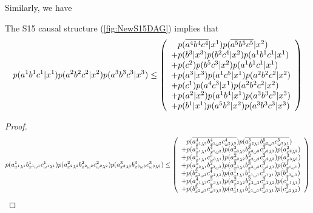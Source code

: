 \clearpage
Similarly, we have
\begin{prop}\label{prop:s15d3}
The S15 causal structure (\cref{fig:NewS15DAG}) implies that
\begin{align*}
p\lparen a^1 b^1 c^1|x^1\rparen p\lparen a^2 b^2 c^2|x^2\rparen p\lparen a^3 b^3 c^3|x^3\rparen
\leq
\left\lparen\begin{array}{l}
\hphantom{+}p\lparen\overline{a^4} \overline{b^4} \overline{c^4}|x^1\rparen p\lparen\overline{a^5} \overline{b^5} \overline{c^5}|x^2\rparen
\\+p\lparen b^3|x^3\rparen p\lparen b^2 c^4|x^2\rparen p\lparen a^1 b^1 c^1|x^1\rparen
\\+p\lparen c^2\rparen p\lparen b^5 c^3|x^2\rparen p\lparen a^1 b^1 c^1|x^1\rparen
\\+p\lparen a^3|x^3\rparen p\lparen a^1 c^5|x^1\rparen p\lparen a^2 b^2 c^2|x^2\rparen
\\+p\lparen c^1\rparen p\lparen a^4 c^3|x^1\rparen p\lparen a^2 b^2 c^2|x^2\rparen
\\+p\lparen a^2|x^2\rparen p\lparen a^1 b^4|x^1\rparen p\lparen a^3 b^3 c^3|x^3\rparen
\\+p\lparen b^1|x^1\rparen p\lparen a^5 b^2|x^2\rparen p\lparen a^3 b^3 c^3|x^3\rparen
\end{array}\right\rparen
\end{align*}
\end{prop}
\begin{proof}
\begin{align}\label{eq:s15d3structineq}
\p{a^1_{x^1 \lambda^1} b^1_{x^1 \omega^1} c^1_{\omega^1 \lambda^1}} \p{a^2_{x^2 \lambda^2} b^2_{x^2 \omega^2} c^2_{\omega^2 \lambda^2}} \p{a^3_{x^3 \lambda^3} b^3_{x^3 \omega^3} c^3_{\omega^3 \lambda^3}}
\leq
\lparens{
\hphantom{+}\p{\n{a^4_{x^1 \lambda^3}} \n{b^4_{x^1 \omega^2}} \n{c^4_{\omega^2 \lambda^3}}} \p{\n{a^5_{x^2 \lambda^1}} \n{b^5_{x^2 \omega^3}} \n{c^5_{\omega^3 \lambda^1}}}
\\+\p{a^1_{x^1 \lambda^1} b^4_{x^1 \omega^2}} \p{a^3_{x^3 \lambda^3} b^3_{x^3 \omega^3} c^3_{\omega^3 \lambda^3}} \p{a^2_{x^2 \lambda^2}}
\\+\p{a^1_{x^1 \lambda^1} c^5_{\omega^3 \lambda^1}} \p{a^2_{x^2 \lambda^2} b^2_{x^2 \omega^2} c^2_{\omega^2 \lambda^2}} \p{a^3_{x^3 \lambda^3}}
\\+\p{a^5_{x^2 \lambda^1} b^2_{x^2 \omega^2}} \p{a^3_{x^3 \lambda^3} b^3_{x^3 \omega^3} c^3_{\omega^3 \lambda^3}} \p{b^1_{x^1 \omega^1}}
\\+\p{b^2_{x^2 \omega^2} c^4_{\omega^2 \lambda^3}} \p{a^1_{x^1 \lambda^1} b^1_{x^1 \omega^1} c^1_{\omega^1 \lambda^1}} \p{b^3_{x^3 \omega^3}}
\\+\p{a^4_{x^1 \lambda^3} c^3_{\omega^3 \lambda^3}} \p{a^2_{x^2 \lambda^2} b^2_{x^2 \omega^2} c^2_{\omega^2 \lambda^2}} \p{c^1_{\omega^1 \lambda^1}}
\\+\p{b^5_{x^2 \omega^3} c^3_{\omega^3 \lambda^3}} \p{a^1_{x^1 \lambda^1} b^1_{x^1 \omega^1} c^1_{\omega^1 \lambda^1}} \p{c^2_{\omega^2 \lambda^2}}
}\qedhere
\end{align}
\end{proof}
